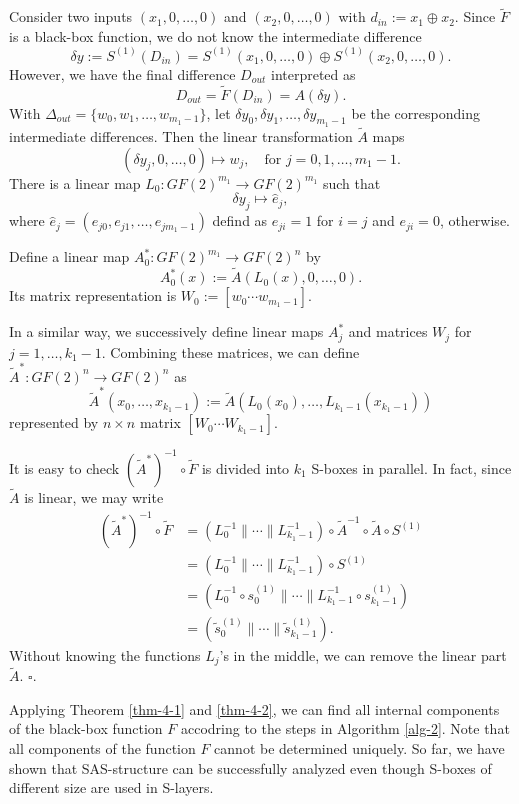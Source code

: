 \documentclass{ieeeaccess}
\begin{document}
Consider two inputs $(x_1,0,\ldots, 0)$ and $(x_2,0,\ldots, 0)$ with
$d_{in} := x_1 \oplus x_2$.
Since $\tilde F$ is a black-box function,
we do not know the intermediate difference 
\[
\delta y := S^{(1)}(D_{in}) = S^{(1)}(x_1,0,\ldots,0) \oplus S^{(1)}(x_2,0,\ldots,0).
\]
However, we have the final difference $D_{out}$ interpreted as
\[
D_{out} = \tilde F(D_{in}) = A(\delta y).
\]
With $\Delta_{out} = \{ w_0, w_1, \ldots, w_{m_1-1} \}$,
let $\delta y_0, \delta y_1, \ldots, \delta y_{m_1-1}$ be the corresponding
intermediate differences.
Then the linear transformation $\tilde A$ maps
\[
(\delta y_j, 0,\ldots, 0) \mapsto w_j,
\quad\text{for } j=0,1,\ldots, m_1-1.
\]
There is a linear map $L_0 :GF(2)^{m_1} \to GF(2)^{m_1}$ such that
\[
\delta y_j \mapsto \hat e_j,
\]
where $\hat e_j = (e_{j0}, e_{j1}, \ldots, e_{jm_1-1})$ defind as
$e_{ji} = 1$ for $i=j$ and $e_{ji} = 0$, otherwise.

Define a linear map $A^*_0: GF(2)^{m_1} \to GF(2)^n$ by
\[
A^*_0(x) := \tilde A(L_0(x), 0,\ldots, 0).
\]
Its matrix representation is $W_0:=\left[  w_0 \cdots w_{m_1-1} \right]$.

In a similar way, we successively define linear maps $A^*_j$ 
and matrices $W_j$ for $j=1,\ldots, k_1-1$.
Combining these matrices, we can define $\tilde A^*:GF(2)^n \to GF(2)^n$ as
\[
\tilde A^*(x_0, \ldots, x_{k_1-1}) := \tilde A(L_0(x_0), \ldots, L_{k_1-1}(x_{k_1-1}))
\]
represented by $n\times n$ matrix $\left[W_0 \cdots W_{k_1-1} \right]$.

It is easy to check $(\tilde A^*)^{-1}\circ \tilde F$ is 
divided into  $k_1$ S-boxes in parallel.
In fact, since $\tilde A$ is linear, we may write
\begin{align*}
(\tilde A^*)^{-1}\circ \tilde F
&= (L_0^{-1}\| \cdots \| L_{k_1-1}^{-1}) \circ \tilde A^{-1}
\circ \tilde A \circ S^{(1)}  \\
&=  (L_0^{-1}\| \cdots \| L_{k_1-1}^{-1}) \circ S^{(1)}  \\
&= (L_0^{-1}\circ s_0^{(1)} \| \cdots \| L_{k_1-1}^{-1}\circ s_{k_1-1}^{(1)}) \\
&= (\tilde s_0^{(1)} \| \cdots \| \tilde s_{k_1-1}^{(1)}). 
\end{align*}
Without knowing the functions $L_j$'s in the middle, we
can remove the linear part $\tilde A$.
\hfill $\square$.  

Applying Theorem \ref{thm-4-1} and \ref{thm-4-2}, 
we can find all internal components of the black-box function $F$ 
accodring to the steps in Algorithm \ref{alg-2}.
Note that all components of the function $F$ cannot be determined uniquely.
So far, we have shown that SAS-structure can be successfully analyzed even though
S-boxes of different size are used in S-layers.
\end{document}
